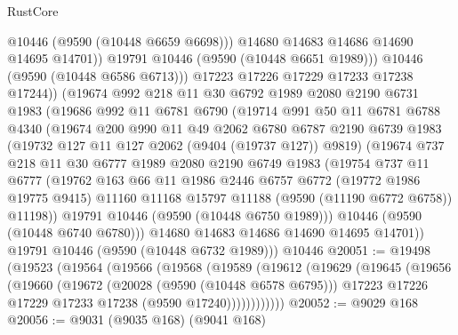 \begin{lexlean}{RustCore}
\begin{coremodule}
                  @10446
                  (@9590 (@10448 @6659 @6698)))
                @14680
                @14683
                @14686
                @14690
                @14695
                @14701))
            @19791
            @10446
            (@9590 (@10448 @6651 @1989)))
          @10446
          (@9590 (@10448 @6586 @6713)))
        @17223
        @17226
        @17229
        @17233
        @17238
        @17244))
    (@19674
      @992
      @218
      @11
      @30
      @6792
      @1989
      @2080
      @2190
      @6731
      @1983
      (@19686
        @992
        @11
        @6781
        @6790
        (@19714
          @991
          @50
          @11
          @6781
          @6788
          @4340
          (@19674
            @200
            @990
            @11
            @49
            @2062
            @6780
            @6787
            @2190
            @6739
            @1983
            (@19732 @127 @11 @127 @2062 (@9404 (@19737 @127)) @9819)
            (@19674
              @737
              @218
              @11
              @30
              @6777
              @1989
              @2080
              @2190
              @6749
              @1983
              (@19754
                @737
                @11
                @6777
                (@19762
                  @163
                  @66
                  @11
                  @1986
                  @2446
                  @6757
                  @6772
                  (@19772 @1986 @19775 @9415)
                  @11160
                  @11168
                  @15797
                  @11188
                  (@9590 (@11190 @6772 @6758))
                  @11198))
              @19791
              @10446
              (@9590 (@10448 @6750 @1989)))
            @10446
            (@9590 (@10448 @6740 @6780)))
          @14680
          @14683
          @14686
          @14690
          @14695
          @14701))
      @19791
      @10446
      (@9590 (@10448 @6732 @1989)))
    @10446
@20051 := @19498
    (@19523
      (@19564
        (@19566
          (@19568
            (@19589
              (@19612
                (@19629
                  (@19645
                    (@19656
                      (@19660
                        (@19672
                          (@20028 (@9590 (@10448 @6578 @6795)))
                          @17223
                          @17226
                          @17229
                          @17233
                          @17238
                          (@9590 @17240))))))))))))
@20052 := @9029 @168
@20056 := @9031 (@9035 @168) (@9041 @168)

\end{coremodule}
\end{lexlean}
